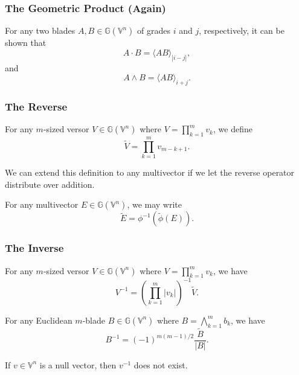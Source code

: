 \documentclass{beamer}
\newcommand{\G}{\mathbb{G}}
\newcommand{\V}{\mathbb{V}}
\begin{document}
\begin{frame}
\frametitle{The Geometric Product (Again)}
\begin{lemma}
For any two blades $A,B\in\G(\V^n)$ of grades $i$ and $j$, respectively, it
can be shown that
\begin{equation*}
A\cdot B = \langle AB\rangle_{|i-j|},
\end{equation*}
and
\begin{equation*}
A\wedge B = \langle AB\rangle_{i+j}.
\end{equation*}
\end{lemma}
\end{frame}

\begin{frame}
\frametitle{The Reverse}
\begin{definition}
For any $m$-sized versor $V\in\G(\V^n)$ where $V=\prod_{k=1}^m v_k$,
we define
\begin{equation*}
\tilde{V} = \prod_{k=1}^m v_{m-k+1}.
\end{equation*}
\end{definition}
We can extend this definition to any multivector if we let
the reverse operator distribute over addition.
\begin{definition}
For any multivector $E\in\G(\V^n)$, we may write
\begin{equation*}
\tilde{E} = \phi^{-1}(\tilde{\phi}(E)).
\end{equation*}
\end{definition}
\end{frame}

\begin{frame}
\frametitle{The Inverse}
\begin{lemma}
For any $m$-sized versor $V\in\G(\V^n)$ where $V=\prod_{k=1}^m v_k$, we have
\begin{equation*}
V^{-1} = \left(\prod_{k=1}^m |v_k|\right)^{-1}\tilde{V}.
\end{equation*}
\end{lemma}
\begin{lemma}
For any \alert{Euclidean} $m$-blade $B\in\G(\V^n)$ where $B=\bigwedge_{k=1}^m b_k$, we have
\begin{equation*}
B^{-1} = (-1)^{m(m-1)/2}\frac{\tilde{B}}{|B|}.
\end{equation*}
\end{lemma}
\begin{example}
If $v\in\V^n$ is a null vector, then $v^{-1}$ does not exist.
\end{example}
\end{frame}
\end{document}
